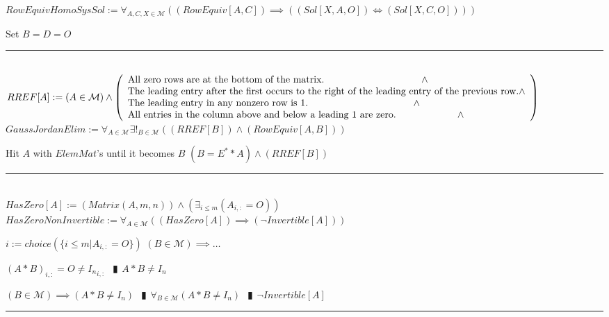 \documentclass{book}
\newcommand{\abr}{:=}
\newcommand{\pipe}{$\phantom{(}\vrectangleblack\phantom{)}$}
\newcommand{\pr}[1]{\left(#1\right)}
\begin{document}
$RowEquivHomoSysSol \abr \forall_{A, C, X \in \mathcal{M}}\pr{(RowEquiv[A, C]) \implies \pr{(Sol[X, A, O]) \iff (Sol[X, C, O])}}$
\begin{enumerate}
  \lit Set $B = D = O$
\end{enumerate} \vspace{.75mm} \hrule \vspace{.75mm} \ \\ 

$RREF[A] \abr (A \in \mathcal{M}) \land \left(\begin{array}{ll}
  \text{All zero rows are at the bottom of the matrix.} \hfill \land \hfill \\
  \text{The leading entry after the first occurs to the right of the leading entry of the previous row.} \hfill \land \hfill \\
  \text{The leading entry in any nonzero row is 1.} \hfill \land \hfill \\
  \text{All entries in the column above and below a leading 1 are zero.} \hfill \land \hfill \\
\end{array}\right)$ \\

$GaussJordanElim \abr \forall_{A \in \mathcal{M}} \exists!_{B \in \mathcal{M}}\pr{(RREF[B]) \land (RowEquiv[A, B])}$
\begin{enumerate}
  \lit Hit $A$ with $ElemMat$'s until it becomes $B$
  \lit $(B = E^* * A) \land (RREF[B])$
\end{enumerate} \vspace{.75mm} \hrule \vspace{.75mm} \ \\ 

$HasZero[A] \abr \pr{Matrix(A, m, n)} \land \pr{\exists_{i \leq m}(A_{i, :} = O)}$ \\

$HasZeroNonInvertible \abr \forall_{A \in \mathcal{M}}\pr{(HasZero[A]) \implies (\lnot Invertible[A])}$
\begin{enumerate}
  \lit $i \abr choice(\{i \leq m | A_{i, :} = O\})$
  \lit $(B \in \mathcal{M}) \implies \ldots$
  \begin{enumerate}
    \lit $(A * B)_{i, :} = O \neq {I_n}_{i, :}$ \pipe $A * B \neq I_n$
  \end{enumerate}
  \lit $(B \in \mathcal{M}) \implies (A * B \neq I_n)$ \pipe $\forall_{B \in \mathcal{M}}(A * B \neq I_n)$ \pipe $\lnot Invertible[A]$
\end{enumerate} \vspace{.75mm} \hrule \vspace{.75mm} \ \\ 
\end{document}

